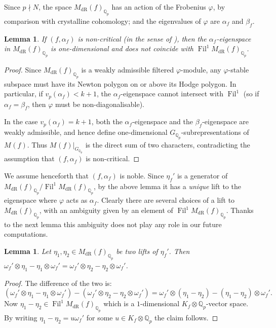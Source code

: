 \documentclass[11pt, a4paper, reqno]{amsart}
\theoremstyle{definition}
\theoremstyle{plain}
\newtheorem{lemma}[definition]{Lemma}
\theoremstyle{remark}
\DeclareMathOperator{\Fil}{Fil}
\DeclareMathOperator{\et}{\acute{e}t}
\DeclareMathOperator{\dR}{dR}
\newcommand{\numberset}{\mathbb}
\newcommand{\Q}{\numberset{Q}}
\renewcommand{\phi}{\varphi}
\begin{document}
  Since $p \nmid N$, the space $M_{\dR}(f)_{\Q_p}$ has an action of the Frobenius $\varphi$, by comparison with crystalline cohomology; and the eigenvalues of $\varphi$ are $\alpha_f$ and $\beta_f$.

  \begin{lemma}
   \label{lemma:frobenius-eigenspaces}
   If $(f, \alpha_f)$ is non-critical (in the sense of ), then the $\alpha_f$-eigenspace in $M_{\dR}(f)_{\Q_p}$ is one-dimensional and does not coincide with $\Fil^1 M_{\dR}(f)_{\Q_p}$.
  \end{lemma}

  \begin{proof}
   Since $M_{\dR}(f)_{\Q_p}$ is a weakly admissible filtered $\varphi$-module, any $\varphi$-stable subspace must have its Newton polygon on or above its Hodge polygon. In particular, if $v_p(\alpha_f) < k+1$, the $\alpha_f$-eigenspace cannot intersect with $\Fil^1$ (so if $\alpha_f = \beta_f$, then $\varphi$ must be non-diagonalisable).
   
   In the case $v_p(\alpha_f) = k+1$, both the $\alpha_f$-eigenspace and the $\beta_f$-eigenspace are weakly admissible, and hence define one-dimensional $G_{\Q_p}$-subrepresentations of $M_{\et}(f)$. Thus $M_{\et}(f)|_{G_{\Q_p}}$ is the direct sum of two characters, contradicting the assumption that $(f, \alpha_f)$ is non-critical.
  \end{proof}

  We assume henceforth that $(f, \alpha_f)$ is noble. Since $\eta_f'$ is a generator of $M_{\dR}(f)_{\Q_p}/\Fil^1 M_{\dR}(f)_{\Q_p}$, by the above lemma it has a \emph{unique} lift to the eigenspace where $\phi$ acts as $\alpha_f$. Clearly there are several choices of a lift to $M_{\dR}(f)_{\Q_p}$, with an ambiguity given by an element of $\Fil^1 M_{\dR}(f)_{\Q_p}$. Thanks to the next lemma this ambiguity does not play any role in our future computations.

  \begin{lemma}
   Let $\eta_1, \eta_2 \in M_{\dR}(f)_{\Q_p}$ be two lifts of $\eta_f'$. Then $\omega_f' \otimes \eta_1 - \eta_1 \otimes \omega_f' = \omega_f' \otimes \eta_2 - \eta_2 \otimes \omega_f'$.
  \end{lemma}

  \begin{proof}
   The difference of the two is:
   \[
    (\omega_f' \otimes \eta_1 - \eta_1 \otimes \omega_f') - (\omega_f'\otimes \eta_2 - \eta_2 \otimes \omega_f') = \omega_f' \otimes (\eta_1 - \eta_2) - (\eta_1 - \eta_2)\otimes \omega_f'.
   \]
   Now $\eta_1 - \eta_2 \in \Fil^1 M_{\dR}(f)_{\Q_p}$ which is a $1$-dimensional $K_f\otimes\Q_p$-vector space. By writing $\eta_1 - \eta_2 = u\omega_f'$ for some $u\in K_f\otimes\Q_p$ the claim follows.
  \end{proof}
\end{document}
